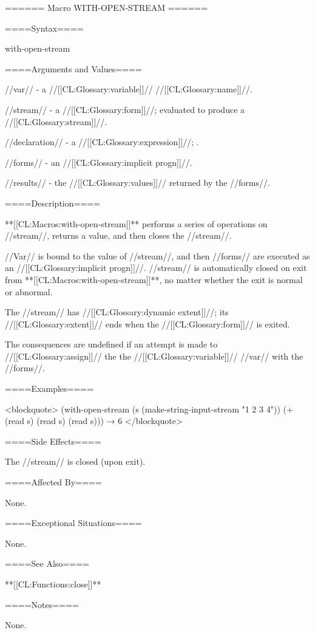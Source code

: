 ====== Macro WITH-OPEN-STREAM ======

====Syntax====

\DefmacWithValuesNewline with-open-stream {  } {}

====Arguments and Values====

//var// - a //[[CL:Glossary:variable]]// //[[CL:Glossary:name]]//.

//stream// - a //[[CL:Glossary:form]]//; evaluated to produce a //[[CL:Glossary:stream]]//.

//declaration// - a  //[[CL:Glossary:expression]]//; \noeval.

//forms// - an //[[CL:Glossary:implicit progn]]//.

//results// - the //[[CL:Glossary:values]]// returned by the //forms//.

====Description====

**[[CL:Macros:with-open-stream]]** performs a series of operations on //stream//, returns a value, and then closes the //stream//.

//Var// is bound to the value of //stream//, and then //forms// are executed as an //[[CL:Glossary:implicit progn]]//. //stream// is automatically closed on exit from **[[CL:Macros:with-open-stream]]**, no matter whether the exit is normal or abnormal.

The //stream// has //[[CL:Glossary:dynamic extent]]//; its //[[CL:Glossary:extent]]// ends when the //[[CL:Glossary:form]]// is exited.

The consequences are undefined if an attempt is made to //[[CL:Glossary:assign]]// the the //[[CL:Glossary:variable]]// //var// with the //forms//.

====Examples====

<blockquote> (with-open-stream (s (make-string-input-stream "1 2 3 4")) (+ (read s) (read s) (read s))) → 6 </blockquote>

====Side Effects====

The //stream// is closed (upon exit).

====Affected By====

None.

====Exceptional Situations====

None.

====See Also====

**[[CL:Functions:close]]**

====Notes====

None.

  
